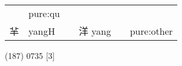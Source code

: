 \documentclass[14pt,a4paper]{scrartcl}
\begin{document}
\begin{longtable}[c]{@{}llllll@{}}
\begin{minipage}[t]{0.14\columnwidth}
\strut\end{minipage} &
\begin{minipage}[t]{0.14\columnwidth}\raggedright\strut
pure:qu
\strut\end{minipage}\tabularnewline
\begin{minipage}[t]{0.14\columnwidth}\raggedright\strut
𦍋
\strut\end{minipage} &
\begin{minipage}[t]{0.14\columnwidth}\raggedright\strut
yangH
\strut\end{minipage} &
\begin{minipage}[t]{0.14\columnwidth}\raggedright\strut
\strut\end{minipage} &
\begin{minipage}[t]{0.14\columnwidth}\raggedright\strut
洋 yang
\strut\end{minipage} &
\begin{minipage}[t]{0.14\columnwidth}\raggedright\strut
\strut\end{minipage} &
\begin{minipage}[t]{0.14\columnwidth}\raggedright\strut
pure:other
\strut\end{minipage}\tabularnewline
\bottomrule
\end{longtable}

(187) 0735 {[}3{]}
\end{document}
